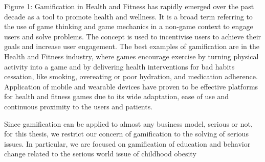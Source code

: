 Figure 1: 
Gamification in Health and Fitness has rapidly emerged over the past decade as a tool to promote health and wellness. It is a broad term referring to the use of game thinking and game mechanics in a non-game context to engage users and solve problems. The concept is used to incentivise users to achieve their goals and increase user engagement. The best examples of gamification are in the Health and Fitness industry, where games encourage exercise by turning physical activity into a game and by delivering health interventions for bad habits cessation, like smoking, overeating or poor hydration, and medication adherence. Application of mobile and wearable devices have proven to be effective platforms for health and fitness games due to its wide adaptation, ease of use and continuous proximity to the users and patients.



Since gamification can be applied to almost any business model, serious or not,
for this thesis, we restrict our concern of gamification to the solving of serious issues. In
particular, we are focused on gamification of education and behavior change related to the
serious world issue of childhood obesity